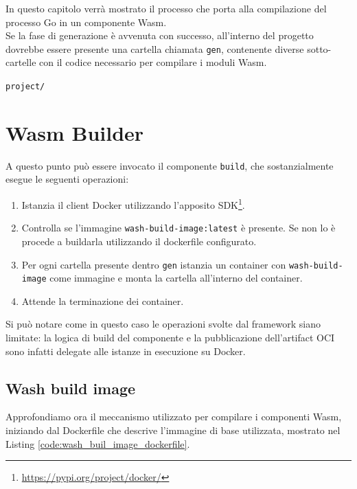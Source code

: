 In questo capitolo verrà mostrato il processo che porta alla compilazione del processo Go in un componente Wasm.\\

Se la fase di generazione è avvenuta con successo, all'interno del progetto dovrebbe essere presente una cartella chiamata \texttt{gen}, contenente diverse sotto-cartelle con il codice necessario per compilare i moduli Wasm.

\texttt{project/}

\section{Wasm Builder}

A questo punto può essere invocato il componente \texttt{build}, che sostanzialmente esegue le seguenti operazioni:
\begin{enumerate}
    \item Istanzia il client Docker utilizzando l'apposito SDK\footnote{\url{https://pypi.org/project/docker/}}.
    \item Controlla se l'immagine \texttt{wash-build-image:latest} è presente. Se non lo è procede a buildarla utilizzando il dockerfile configurato.
    \item Per ogni cartella presente dentro \texttt{gen} istanzia un container con \texttt{wash-build-image} come immagine e monta la cartella all'interno del container.
    \item Attende la terminazione dei container.
\end{enumerate}

Si può notare come in questo caso le operazioni svolte dal framework siano limitate: la logica di build del componente e la pubblicazione dell'artifact OCI sono infatti delegate alle istanze in esecuzione su Docker.
    
\subsection{Wash build image}

Approfondiamo ora il meccanismo utilizzato per compilare i componenti Wasm, iniziando dal Dockerfile che descrive l'immagine di base utilizzata, mostrato nel Listing \ref{code:wash_buil_image_dockerfile}.

